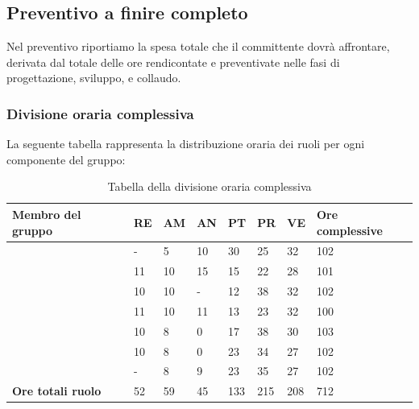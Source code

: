 \subsection{Preventivo a finire completo} 
Nel preventivo riportiamo la spesa totale che il committente dovrà affrontare, derivata dal totale delle ore rendicontate e preventivate nelle fasi di progettazione, sviluppo, e collaudo.

\subsubsection{Divisione oraria complessiva} 
La seguente tabella rappresenta la distribuzione oraria dei ruoli per ogni componente del gruppo:
{
\renewcommand{\arraystretch}{2}
\begin{longtable}[h!] { C{3.5cm} C{1cm} C{1cm} C{1cm} C{1cm} C{1cm} C{1cm} C{2cm}}
\caption{Tabella della divisione oraria complessiva}	\\
\rowcolor{\primaryColor}

\textcolor{\secondaryColor}{\textbf{Membro del gruppo}} & 
\textcolor{\secondaryColor}{\textbf{RE}} & 
\textcolor{\secondaryColor}{\textbf{AM}} & 
\textcolor{\secondaryColor}{\textbf{AN}} & 
\textcolor{\secondaryColor}{\textbf{PT}} & 
\textcolor{\secondaryColor}{\textbf{PR}} & 
\textcolor{\secondaryColor}{\textbf{VE}} & 
\textcolor{\secondaryColor}{\textbf{Ore complessive}}\\	
\endhead

\AW{}                     & - & 5 & 10 & 30 & 25 & 32 & 102 \\
\AT{}                     & 11 & 10 & 15 & 15 & 22 & 28 & 101 \\
\AD{}                     & 10 & 10 & - & 12 & 38 & 32 & 102 \\
\EC{}                     & 11 & 10 &  11 & 13 & 23 & 32 & 100 \\
\EM{}                     & 10 & 8  &  0 & 17 & 38 & 30 & 103 \\
\FP{}                     & 10 & 8  &  0 & 23 & 34 & 27 & 102 \\
\GG{}                     &  - & 8  & 9 & 23 & 35 & 27 & 102 \\
\textbf{Ore totali ruolo} & 52  & 59 & 45 & 133 & 215 & 208 & 712 \\
\end{longtable}
}

